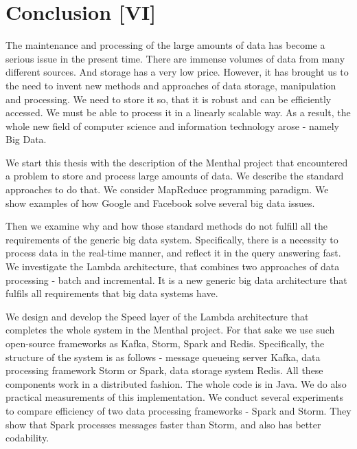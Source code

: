 \chapter{Conclusion [VI]}
\label{chap:conclusion}

The maintenance and processing of the large amounts of data has become a serious issue in the present time.
There are immense volumes of data from many different sources.
And storage has a very low price.
However, it has brought us to the need to invent new methods and approaches of data storage, manipulation and processing.
We need to store it so, that it is robust and can be efficiently accessed.
We must be able to process it in a linearly scalable way.
As a result, the whole new field of computer science and information technology arose - namely Big Data.

We start this thesis with the description of the Menthal project that encountered a problem to store and process large amounts of data.
We describe the standard approaches to do that.
We consider MapReduce programming paradigm.
We show examples of how Google and Facebook solve several big data issues.

Then we examine why and how those standard methods do not fulfill all the requirements of the generic big data system.
Specifically, there is a necessity to process data in the real-time manner, and reflect it in the query answering fast.
We investigate the Lambda architecture, that combines two approaches of data processing - batch and incremental.
It is a new generic big data architecture that fulfils all requirements that big data systems have.

We design and develop the Speed layer of the Lambda architecture that completes the whole system in the Menthal project.
For that sake we use such open-source frameworks as Kafka, Storm, Spark and Redis.
Specifically, the structure of the system is as follows - message queueing server Kafka, data processing framework Storm or Spark, data storage system Redis.
All these components work in a distributed fashion.
The whole code is in Java.
We do also practical measurements of this implementation.
We conduct several experiments to compare efficiency of two data processing frameworks - Spark and Storm.
They show that Spark processes messages faster than Storm, and also has better codability.

